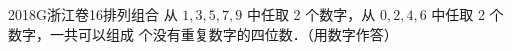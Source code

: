 
\begin{problem}{2018}{G}{浙江卷}{16}{排列组合}
从 $ 1,3,5,7,9 $ 中任取 2 个数字，从 $ 0,2,4,6 $ 中任取 2 个数字，一共可以组成 \underline{\hspace{4em}} 个没有重复数字的四位数．（用数字作答）
\end{problem}

\begin{answer}

\end{answer}

\begin{solutions}

\end{solutions}